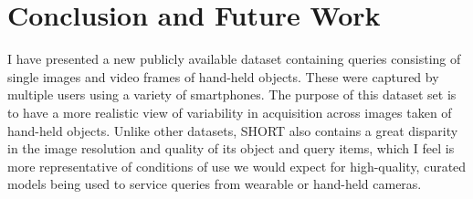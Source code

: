 


\section{Conclusion and Future Work} \label{sec:conclusions}

I have presented a new publicly available  dataset containing queries consisting of single images and video frames of hand-held objects.  These were captured by multiple users using a variety of smartphones. The purpose of this dataset set is to have a more realistic view of variability in acquisition across images taken of hand-held objects. Unlike other datasets, SHORT also contains a great disparity in the image resolution and quality of its object and query items, which I feel is more representative of conditions of use we would expect for high-quality, curated models being used to service queries from wearable or hand-held cameras.

